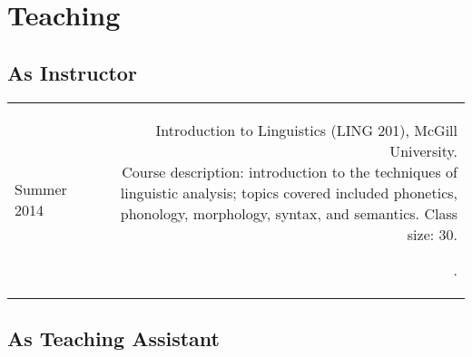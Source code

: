 \documentclass[11pt,letterpaper,twoside]{article}
\makeatletter
\newcommand{\bodywidth}{0.77}
\newenvironment{cvsection}{%
  \setlength{\extrarowheight}{0.70ex}
  \begin{longtable}[l]{@{} L R @{}}
}{%
  \end{longtable}
}
\newcommand{\course}[3]{%
  \parbox[t]{\bodywidth\textwidth}{#1.\\ {\footnotesize Course description: #2.
      Class size: #3.}}
}
\makeatother
\begin{document}
\section*{Teaching}

\subsection*{As Instructor}

\begin{cvsection}
  Summer 2014 & \course{Introduction to Linguistics (LING 201), McGill University}
  {introduction to the techniques of linguistic analysis; topics covered included phonetics, phonology, morphology, syntax, and semantics}
  {30}.
\end{cvsection}

\subsection*{As Teaching Assistant}
\end{document}

